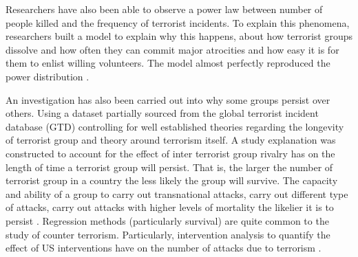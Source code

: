 Researchers have also been able to observe a power law between number of people killed and the frequency of terrorist incidents. To explain this phenomena, researchers built a model to explain why this happens, about how terrorist groups dissolve and how often they can commit major atrocities and how easy it is for them to enlist willing volunteers. The model almost perfectly reproduced the power distribution \citep{clauset2005scale}.

An investigation has also been carried out into why some groups persist over others. Using a dataset partially sourced from the global terrorist incident database (GTD) controlling for well established theories regarding the longevity of terrorist group and theory around terrorism itself. A study explanation was constructed to account for the effect of inter terrorist group rivalry has on the length of time a terrorist group will persist. That is, the larger the number of terrorist group in a country the less likely the group will survive. The capacity and ability of a group to carry out transnational attacks, carry out different type of attacks, carry out attacks with higher levels of mortality the likelier it is to persist \citep{young2014survival}. Regression methods (particularly survival) are quite common to the study of counter terrorism. Particularly, intervention analysis to quantify the effect of US interventions have on the number of attacks due to terrorism \citep{enders1993effectiveness}.

